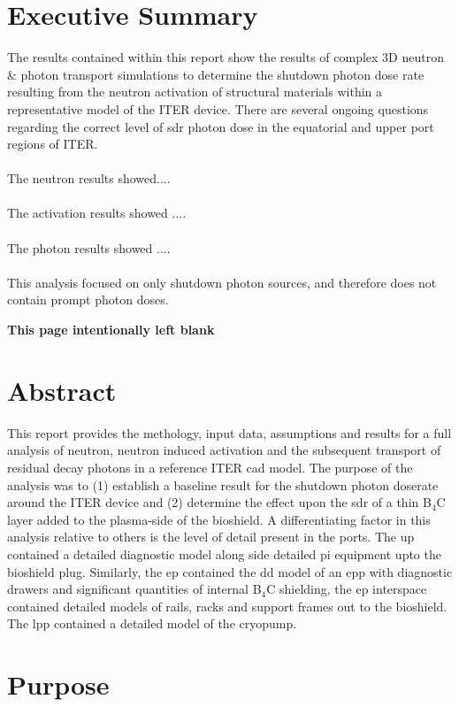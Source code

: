 \documentclass[12pt]{article}
\newcommand*{\blankpage}{%
\vspace*{\fill}
\begin{center}
 \centering \textbf{This page intentionally left blank}
\end{center}
\vspace{\fill}}
\begin{document}
\section*{Executive Summary}
The results contained within this report show the results of complex 3D neutron
\& photon transport simulations to determine the shutdown photon dose rate
resulting from the neutron activation of structural materials within a
representative model of the ITER device. There are several ongoing questions
regarding the correct level of \gls{sdr} photon dose in the equatorial and upper port
regions of ITER.
\\
\\
The neutron results showed....
\\
\\
The activation results showed ....
\\
\\
The photon results showed ....
\\
\\
This analysis focused on only shutdown photon sources, and therefore does not
contain prompt photon doses.
\newpage
\blankpage
\newpage
\section*{Abstract}
This report provides the methology, input data, assumptions and results for a
full analysis of neutron, neutron induced activation and the subsequent
transport of residual decay photons in a reference ITER \gls{cad} model. The purpose
of the analysis was to (1) establish a baseline result for the shutdown photon
doserate around the ITER device and (2) determine the effect upon the \gls{sdr} of a
thin B$_4$C layer added to the plasma-side of the bioshield. A differentiating
factor in this analysis relative to others is the level of detail present in
the ports. The \gls{up} contained a detailed diagnostic model along side detailed \gls{pi}
equipment upto the bioshield plug. Similarly, the \gls{ep} contained the \gls{dd} model of
an \gls{epp} with diagnostic drawers and significant quantities of internal B$_4$C
shielding, the \gls{ep} interspace contained detailed models of rails, racks and
support frames out to the bioshield. The \gls{lpp} contained a detailed model of the
cryopump. 
\newpage
\section{Purpose}
\end{document}
